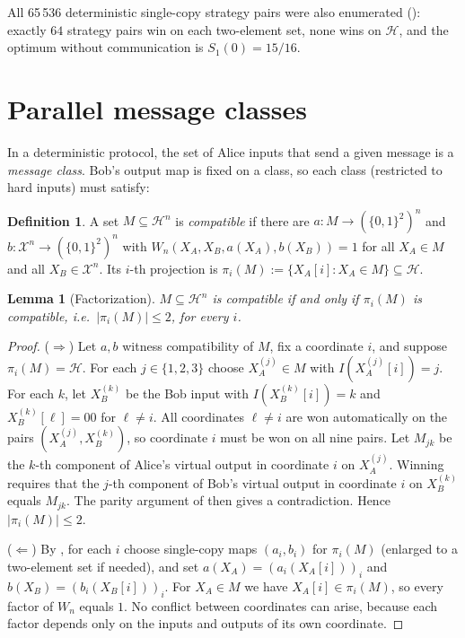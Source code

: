 \documentclass[12pt,a4paper]{article}
\newtheorem{lemma}[theorem]{Lemma}
\theoremstyle{definition}
\newtheorem{definition}[theorem]{Definition}
\theoremstyle{remark}
\newcommand{\Hd}{\mathcal{H}}   %
\newcommand{\Xall}{\mathcal{X}} %
\begin{document}
All 65\,536 deterministic single-copy strategy pairs were also enumerated (): exactly $64$ strategy pairs win on each two-element set, none wins on $\Hd$, and the optimum without communication is $S_1(0)=15/16$.

\section{Parallel message classes}
\label{sec:parallel}

In a deterministic protocol, the set of Alice inputs that send a given message is a \emph{message class}. Bob's output map is fixed on a class, so each class (restricted to hard inputs) must satisfy:

\begin{definition}
\label{def:ncompat}
A set $M \subseteq \Hd^n$ is \emph{compatible} if there are $a: M \to (\{0,1\}^2)^n$ and $b: \Xall^n \to (\{0,1\}^2)^n$ with $W_n(X_A,X_B,a(X_A),b(X_B))=1$ for all $X_A\in M$ and all $X_B\in\Xall^n$. Its $i$-th projection is $\pi_i(M) := \{X_A[i] : X_A \in M\} \subseteq \Hd$.
\end{definition}

\begin{lemma}[Factorization]
\label{lem:factor}
$M \subseteq \Hd^n$ is compatible if and only if $\pi_i(M)$ is compatible, i.e.\ $|\pi_i(M)|\le 2$, for every $i$.
\end{lemma}

\begin{proof}
($\Rightarrow$) Let $a,b$ witness compatibility of $M$, fix a coordinate $i$, and suppose $\pi_i(M)=\Hd$. For each $j\in\{1,2,3\}$ choose $X_A^{(j)}\in M$ with $I(X_A^{(j)}[i])=j$. For each $k$, let $X_B^{(k)}$ be the Bob input with $I(X_B^{(k)}[i])=k$ and $X_B^{(k)}[\ell]=00$ for $\ell\ne i$. All coordinates $\ell \ne i$ are won automatically on the pairs $(X_A^{(j)},X_B^{(k)})$, so coordinate $i$ must be won on all nine pairs. Let $M_{jk}$ be the $k$-th component of Alice's virtual output in coordinate $i$ on $X_A^{(j)}$. Winning requires that the $j$-th component of Bob's virtual output in coordinate $i$ on $X_B^{(k)}$ equals $M_{jk}$. The parity argument of  then gives a contradiction. Hence $|\pi_i(M)|\le2$.

($\Leftarrow$) By , for each $i$ choose single-copy maps $(a_i,b_i)$ for $\pi_i(M)$ (enlarged to a two-element set if needed), and set $a(X_A)=(a_i(X_A[i]))_i$ and $b(X_B)=(b_i(X_B[i]))_i$. For $X_A\in M$ we have $X_A[i]\in\pi_i(M)$, so every factor of $W_n$ equals $1$. No conflict between coordinates can arise, because each factor depends only on the inputs and outputs of its own coordinate.
\end{proof}
\end{document}
